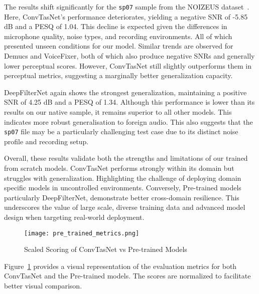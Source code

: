 The results shift significantly for the \texttt{sp07} sample from the NOIZEUS dataset~\cite{hu2007subjective}. Here, ConvTasNet's performance deteriorates, yielding a negative SNR of -5.85 dB and a PESQ of 1.04. This decline is expected given the differences in microphone quality, noise types, and recording environments. All of which presented unseen conditions for our model. Similar trends are observed for Demucs and VoiceFixer, both of which also produce negative SNRs and generally lower perceptual scores. However, ConvTasNet still slightly outperforms them in perceptual metrics, suggesting a marginally better generalization capacity.

DeepFilterNet again shows the strongest generalization, maintaining a positive SNR of 4.25 dB and a PESQ of 1.34. Although this performance is lower than its results on our native sample, it remains superior to all other models. This indicates more robust generalisation to foreign audio. This also suggests that the \texttt{sp07} file may be a particularly challenging test case due to its distinct noise profile and recording setup.

Overall, these results validate both the strengths and limitations of our trained from scratch models. ConvTasNet performs strongly within its domain but struggles with generalization. Highlighting the challenge of deploying domain specific models in uncontrolled environments. Conversely, Pre-trained models particularly DeepFilterNet, demonstrate better cross-domain resilience. This underscores the value of large scale, diverse training data and advanced model design when targeting real-world deployment.

\begin{figure}[H]
\centering
\texttt{[image: pre\_trained\_metrics.png]}
\caption{Scaled Scoring of ConvTasNet vs Pre-trained Models}
\label{fig:pretrained_metrics}
\end{figure}
\noindent

Figure~\ref{fig:pretrained_metrics} provides a visual representation of the evaluation metrics for both ConvTasNet and the Pre-trained models. The scores are normalized to facilitate better visual comparison.

